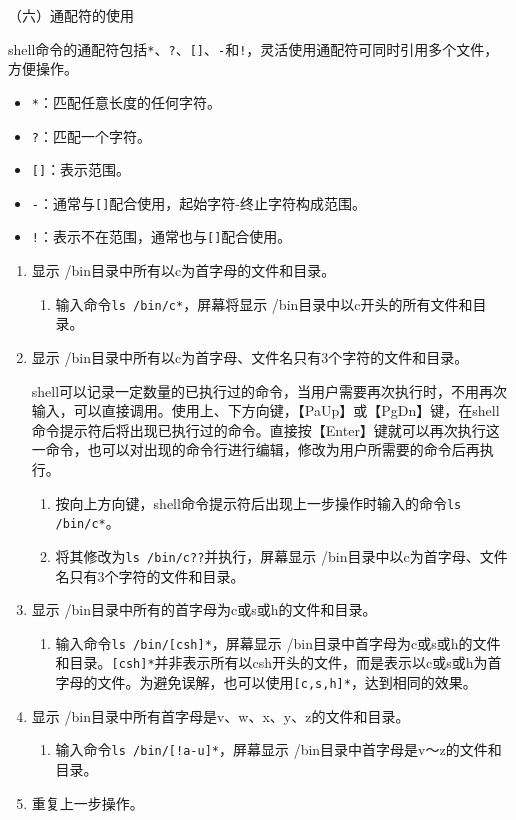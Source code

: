 \vspace{0.1in}
（六）通配符的使用

shell命令的通配符包括\verb|*|、\verb|?|、\verb|[]|、\verb|-|和\verb|!|，灵活使用通配符可同时引用多个文件，方便操作。
\begin{itemize}
  \item \verb|*|：匹配任意长度的任何字符。
  \item \verb|?|：匹配一个字符。
  \item \verb|[]|：表示范围。
  \item \verb|-|：通常与\verb|[]|配合使用，起始字符-终止字符构成范围。
  \item \verb|!|：表示不在范围，通常也与\verb|[]|配合使用。
\end{itemize}
\begin{enumerate}
  \item 显示 /bin目录中所有以c为首字母的文件和目录。
    \begin{enumerate}
      \item 输入命令\verb|ls /bin/c*|，屏幕将显示 /bin目录中以c开头的所有文件和目录。
    \end{enumerate}
  \item 显示 /bin目录中所有以c为首字母、文件名只有3个字符的文件和目录。

    shell可以记录一定数量的已执行过的命令，当用户需要再次执行时，不用再次输入，可以直接调用。使用上、下方向键，【PaUp】或【PgDn】键，在shell命令提示符后将出现已执行过的命令。直接按【Enter】键就可以再次执行这一命令，也可以对出现的命令行进行编辑，修改为用户所需要的命令后再执行。
    \begin{enumerate}
      \item 按向上方向键，shell命令提示符后出现上一步操作时输入的命令\verb|ls /bin/c*|。
      \item 将其修改为\verb|ls /bin/c??|并执行，屏幕显示 /bin目录中以c为首字母、文件名只有3个字符的文件和目录。
    \end{enumerate}
  \item 显示 /bin目录中所有的首字母为c或s或h的文件和目录。
    \begin{enumerate}
      \item 输入命令\verb|ls /bin/[csh]*|，屏幕显示 /bin目录中首字母为c或s或h的文件和目录。\verb|[csh]*|并非表示所有以csh开头的文件，而是表示以c或s或h为首字母的文件。为避免误解，也可以使用\verb|[c,s,h]*|，达到相同的效果。
    \end{enumerate}
  \item 显示 /bin目录中所有首字母是v、w、x、y、z的文件和目录。
    \begin{enumerate}
      \item 输入命令\verb|ls /bin/[!a-u]*|，屏幕显示 /bin目录中首字母是v～z的文件和目录。
    \end{enumerate}
  \item 重复上一步操作。
    

\end{enumerate}
